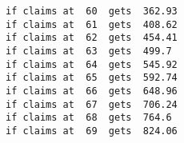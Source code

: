 \documentclass[11pt]{article}
\begin{document}
    \begin{Verbatim}[commandchars=\\\{\}]
if claims at  60  gets  362.93
if claims at  61  gets  408.62
if claims at  62  gets  454.41
if claims at  63  gets  499.7
if claims at  64  gets  545.92
if claims at  65  gets  592.74
if claims at  66  gets  648.96
if claims at  67  gets  706.24
if claims at  68  gets  764.6
if claims at  69  gets  824.06

    \end{Verbatim}


    
    
    
    
\end{document}
